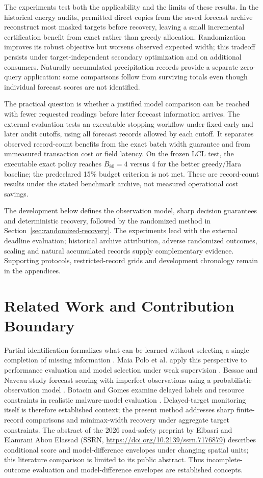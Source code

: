 \documentclass[12pt]{article}
\begin{document}
The experiments test both the applicability and the limits of these results.
In the historical energy audits, permitted direct copies from the saved forecast archive
reconstruct most masked targets before recovery, leaving a small incremental
certification benefit from exact rather than greedy allocation. Randomization
improves its robust objective but worsens observed expected width; this
tradeoff persists under target-independent secondary optimization and on
additional consumers. Naturally accumulated precipitation records provide
a separate zero-query application: some comparisons follow from surviving
totals even though individual forecast scores are not identified.

The practical question is whether a justified model comparison can be reached
with fewer requested readings before later forecast information arrives.
The external evaluation tests an executable stopping workflow under fixed
early and later audit cutoffs, using all forecast records allowed by each
cutoff. It separates observed record-count benefits from the exact batch
width guarantee and from unmeasured transaction cost or field latency.
On the frozen LCL test, the executable exact policy reaches $B_{80}=4$ versus 4 for the better greedy/Hara baseline; the predeclared 15\% budget criterion is not met. These are record-count results under the stated benchmark archive, not measured operational cost savings.

The development below defines the observation model, sharp decision
guarantees and deterministic recovery, followed by the randomized method in
Section~\ref{sec:randomized-recovery}. The experiments lead with the external
deadline evaluation; historical archive attribution, adverse randomized
outcomes, scaling and natural accumulated records supply complementary
evidence. Supporting protocols, restricted-record grids and development
chronology remain in the appendices.

\section{Related Work and Contribution Boundary}
Partial identification formalizes what can be learned without selecting a
single completion of missing information \cite{manski}. Maia Polo et al.
apply this perspective to performance evaluation and model selection under
weak supervision \cite{polo}. Bessac and Naveau study forecast scoring with
imperfect observations using a probabilistic observation model \cite{bessac}.
Botacin and Gomes examine delayed labels and resource constraints in
realistic malware-model evaluation \cite{botacin2025}. Delayed-target
monitoring itself is therefore established context; the present method
addresses sharp finite-record comparisons and minimax-width recovery under
aggregate target constraints.
The abstract of the 2026 road-safety preprint by Elbasri and Elamrani Abou
Elassad (SSRN, \url{https://doi.org/10.2139/ssrn.7176879}) describes
conditional score and model-difference envelopes under changing spatial
units; this literature comparison is limited to its public abstract.
Thus incomplete-outcome evaluation and model-difference
envelopes are established concepts.
\end{document}
